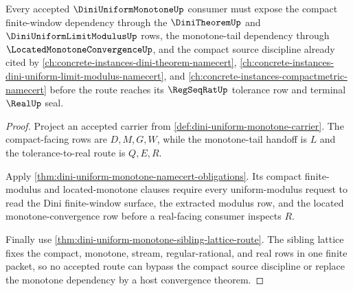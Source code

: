 \begin{theorem}
\label{thm:dini-uniform-monotone-compact-monotone-dependency-route}
Every accepted $\DiniUniformMonotoneUp$ consumer must expose the compact finite-window dependency through the $\DiniTheoremUp$ and $\DiniUniformLimitModulusUp$ rows, the monotone-tail dependency through $\LocatedMonotoneConvergenceUp$, and the compact source discipline already cited by \autoref{ch:concrete-instances-dini-theorem-namecert}, \autoref{ch:concrete-instances-dini-uniform-limit-modulus-namecert}, and \autoref{ch:concrete-instances-compactmetric-namecert} before the route reaches its $\RegSeqRatUp$ tolerance row and terminal $\RealUp$ seal.
\end{theorem}
\begin{proof}
Project an accepted carrier from \autoref{def:dini-uniform-monotone-carrier}. The compact-facing rows are $D,M,G,W$, while the monotone-tail handoff is $L$ and the tolerance-to-real route is $Q,E,R$.

Apply \autoref{thm:dini-uniform-monotone-namecert-obligations}. Its compact finite-modulus and located-monotone clauses require every uniform-modulus request to read the Dini finite-window surface, the extracted modulus row, and the located monotone-convergence row before a real-facing consumer inspects $R$.

Finally use \autoref{thm:dini-uniform-monotone-sibling-lattice-route}. The sibling lattice fixes the compact, monotone, stream, regular-rational, and real rows in one finite packet, so no accepted route can bypass the compact source discipline or replace the monotone dependency by a host convergence theorem.
\end{proof}
